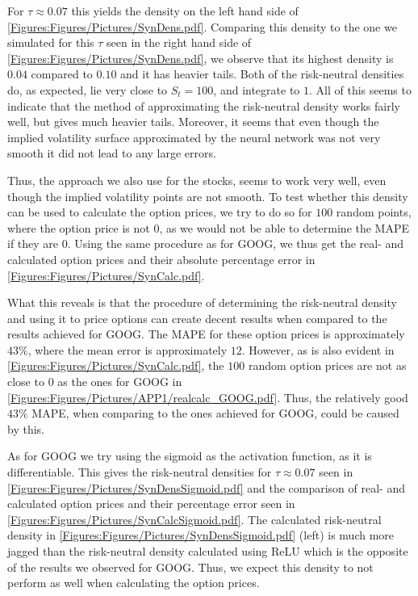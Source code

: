 For $\tau\approx0.07$ this yields the density on the left hand side of \autoref{Figures:Figures/Pictures/SynDens.pdf}. Comparing this density to the one we simulated for this $\tau$ seen in the right hand side of \autoref{Figures:Figures/Pictures/SynDens.pdf}, we observe that its highest density is $0.04$ compared to $0.10$ and it has heavier tails. Both of the risk-neutral densities do, as expected, lie very close to $S_t=100$, and integrate to $1$. All of this seems to indicate that the method of approximating the risk-neutral density works fairly well, but gives much heavier tails. Moreover, it seems that even though the implied volatility surface approximated by the neural network was not very smooth it did not lead to any large errors.


Thus, the approach we also use for the stocks, seems to work very well, even though the implied volatility points are not smooth. To test whether this density can be used to calculate the option prices, we try to do so for $100$ random points, where the option price is not $0$, as we would not be able to determine the MAPE if they are $0$. Using the same procedure as for GOOG, we thus get the real- and calculated option prices and their absolute percentage error in \autoref{Figures:Figures/Pictures/SynCalc.pdf}.


What this reveals is that the procedure of determining the risk-neutral density and using it to price options can create decent results when compared to the results achieved for GOOG. The MAPE for these option prices is approximately $43\%$, where the mean error is approximately $12$. However, as is also evident in \autoref{Figures:Figures/Pictures/SynCalc.pdf}, the $100$ random option prices are not as close to $0$ as the ones for GOOG in \autoref{Figures:Figures/Pictures/APP1/realcalc_GOOG.pdf}. Thus, the relatively good $43\%$ MAPE, when comparing to the ones achieved for GOOG, could be caused by this.
 
As for GOOG we try using the sigmoid as the activation function, as it is differentiable. This gives the risk-neutral densities for $\tau\approx0.07$ seen in \autoref{Figures:Figures/Pictures/SynDensSigmoid.pdf} and the comparison of real- and calculated option prices and their percentage error seen in \autoref{Figures:Figures/Pictures/SynCalcSigmoid.pdf}. The calculated risk-neutral density in \autoref{Figures:Figures/Pictures/SynDensSigmoid.pdf} (left) is much more jagged than the risk-neutral density calculated using ReLU which is the opposite of the results we observed for GOOG. Thus, we expect this density to not perform as well when calculating the option prices.

